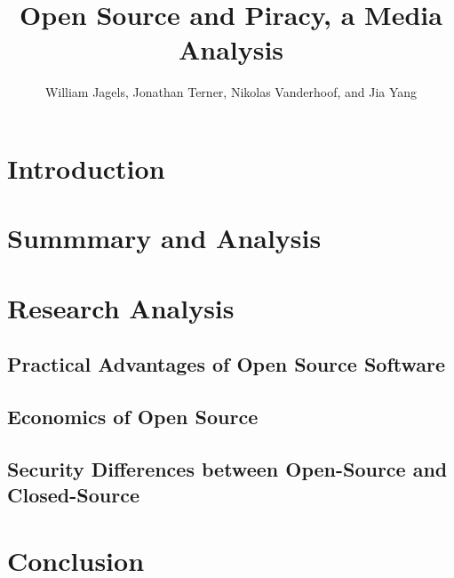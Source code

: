 \documentclass[12pt,babel,english,man,natbib,apacite]{apa6}
\title{Open Source and Piracy, a Media Analysis}
\author{William Jagels, Jonathan Terner, Nikolas Vanderhoof, and Jia Yang}
\affiliation{Binghamton University}
\begin{document}
\maketitle
\section{Introduction}
\section{Summmary and Analysis}

\newpage
\section{Research Analysis}
\subsection{Practical Advantages of Open Source Software}

\newpage
\subsection{Economics of Open Source}

\newpage
\subsection{Security Differences between Open-Source and Closed-Source}

\newpage
\section{Conclusion}
\nocite{*}


\end{document}

